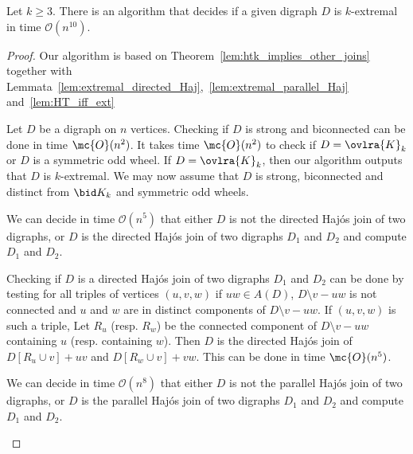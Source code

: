 \begin{theorem}
    Let $k \geq 3$. There is an algorithm that decides if a given digraph $D$ is $k$-extremal in time $\mathcal O(n^{10})$. %
\end{theorem}

\begin{proof} 
    Our algorithm is based on Theorem~\ref{lem:htk_implies_other_joins} together with Lemmata~\ref{lem:extremal_directed_Haj},~\ref{lem:extremal_parallel_Haj} and~\ref{lem:HT_iff_ext}
    
    Let $D$ be a digraph on $n$ vertices. Checking if $D$ is strong and biconnected can be done in time $\mc{O}(n^2)$. It takes time $\mc{O}(n^2)$ to check if $D = \ovlra{K}_k$ or $D$ is a symmetric odd wheel. If $D = \ovlra{K}_k$, then our algorithm outputs that $D$ is $k$-extremal. 
    We may now assume that $D$ is strong, biconnected and distinct from $\bid K_k$ and symmetric odd wheels. 

    \begin{claim}\label{clm:alg_DHJ}
        We can decide in time $\mathcal O(n^5)$ that either $D$ is not  the directed Haj\'os join of two digraphs, or $D$ is the directed Haj\'os join of two digraphs $D_1$ and $D_2$ and compute $D_1$ and $D_2$. 
    \end{claim}

    \begin{proofclaim}
        Checking if $D$ is a directed Haj\'os join of two digraphs $D_1$ and $D_2$ can be done by testing for all triples of vertices $(u, v, w)$ if $uw \in A(D)$, $D \setminus v - uw$ is not connected and $u$ and $w$ are in distinct components of $D \setminus v - uw$. 
        If $(u, v, w)$ is such a triple, Let $R_u$ (resp. $R_w$) be the connected component of $D \setminus v - uw$ containing $u$ (resp. containing $w$).%
        Then $D$ is the directed Haj\'os join of $D[R_u \cup v] + uv$ and $D[R_w \cup v] + vw$. 
        This can be done in time $\mc{O}(n^5)$. 
    \end{proofclaim}

    \begin{claim}\label{clm:alg_parallelJ}
        We can decide in time $\mathcal O(n^8)$ that either $D$ is not the parallel Haj\'os join of two digraphs, or $D$ is the parallel Haj\'os join of two digraphs $D_1$ and $D_2$ and compute $D_1$ and $D_2$. 
    \end{claim}




\end{proof}
